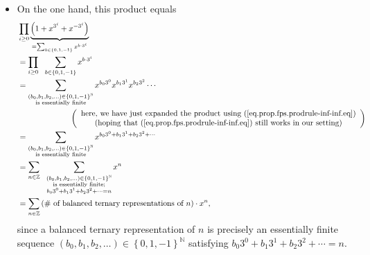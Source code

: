 \begin{itemize}
\item On the one hand, this product equals%
\begin{align}
&  \prod_{i\geq0}\underbrace{\left(  1+x^{3^{i}}+x^{-3^{i}}\right)  }%
_{=\sum_{b\in\left\{  0,1,-1\right\}  }x^{b\cdot3^{i}}}\nonumber\\
&  =\prod_{i\geq0}\ \ \sum_{b\in\left\{  0,1,-1\right\}  }x^{b\cdot3^{i}%
}\nonumber\\
&  =\sum_{\substack{\left(  b_{0},b_{1},b_{2},\ldots\right)  \in\left\{
0,1,-1\right\}  ^{\mathbb{N}}\\\text{is essentially finite}}}x^{b_{0}3^{0}%
}x^{b_{1}3^{1}}x^{b_{2}3^{2}}\cdots\nonumber\\
&  \ \ \ \ \ \ \ \ \ \ \ \ \ \ \ \ \ \ \ \ \left(
\begin{array}
[c]{c}%
\text{here, we have just expanded the product using
(\ref{eq.prop.fps.prodrule-inf-inf.eq})}\\
\text{(hoping that (\ref{eq.prop.fps.prodrule-inf-inf.eq}) still works in our
setting)}%
\end{array}
\right) \nonumber\\
&  =\sum_{\substack{\left(  b_{0},b_{1},b_{2},\ldots\right)  \in\left\{
0,1,-1\right\}  ^{\mathbb{N}}\\\text{is essentially finite}}}x^{b_{0}%
3^{0}+b_{1}3^{1}+b_{2}3^{2}+\cdots}\nonumber\\
&  =\sum_{n\in\mathbb{Z}}\ \ \sum_{\substack{\left(  b_{0},b_{1},b_{2}%
,\ldots\right)  \in\left\{  0,1,-1\right\}  ^{\mathbb{N}}\\\text{is
essentially finite;}\\b_{0}3^{0}+b_{1}3^{1}+b_{2}3^{2}+\cdots=n}%
}x^{n}\nonumber\\
&  =\sum_{n\in\mathbb{Z}}\left(  \text{\# of balanced ternary representations
of }n\right)  \cdot x^{n}, \label{eq.thm.fps.laure.balanced-tern-rep-uniq.1}%
\end{align}
since a balanced ternary representation of $n$ is precisely an essentially
finite sequence $\left(  b_{0},b_{1},b_{2},\ldots\right)  \in\left\{
0,1,-1\right\}  ^{\mathbb{N}}$ satisfying $b_{0}3^{0}+b_{1}3^{1}+b_{2}%
3^{2}+\cdots=n$.


\end{itemize}
